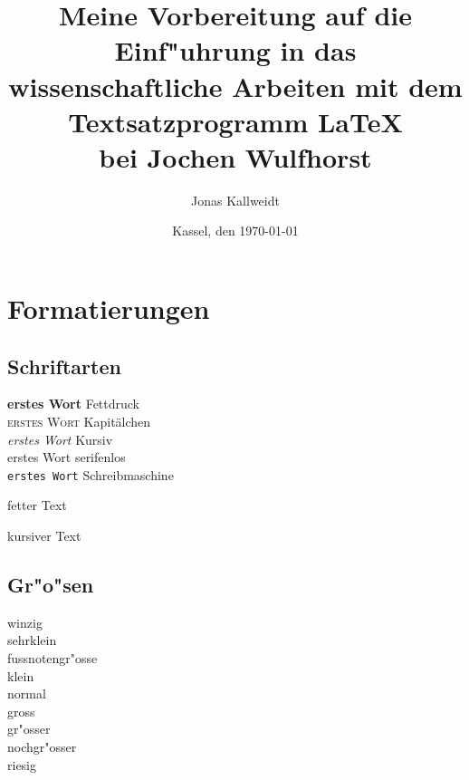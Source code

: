 \documentclass[a4paper,12pt,titlepage]{article} %
\begin{document}
\title{{\textsf{Meine Vorbereitung auf die\\ 
\glqq Einf"uhrung in das wissenschaftliche Arbeiten mit dem Textsatzprogramm \LaTeX\grqq \\
\vspace{1ex}
bei Jochen Wulfhorst}}}
\author{Jonas Kallweidt}
\date{Kassel, den \today}
\maketitle       %
\tableofcontents %
\listoffigures   %
\listoftables    %

\section{Formatierungen}
\subsection{Schriftarten}
\textbf{erstes Wort} Fettdruck\\
\textsc{erstes Wort} Kapitälchen\\
\textit{erstes Wort} Kursiv\\
\textsf{erstes Wort} serifenlos\\
\texttt{erstes Wort} Schreibmaschine\\

\begin{bfseries}
 fetter Text \\
\end{bfseries}
\begin{itshape}
 kursiver Text \\
\end{itshape}

\subsection{Gr"o"sen}
{\tiny winzig} \\
{\scriptsize sehrklein} \\
{\footnotesize fussnotengr"osse} \\
{\small klein} \\
{\normalsize normal} \\
{\large gross} \\
{\Large gr"osser} \\
{\LARGE nochgr"osser} \\
{\huge riesig} \\
\end{document}

